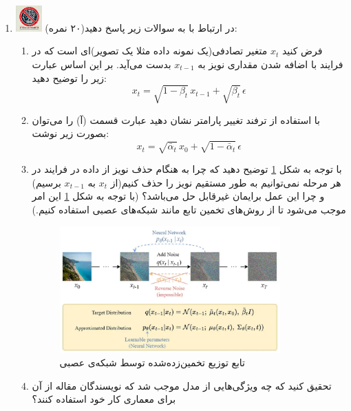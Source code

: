 \documentclass[12pt]{article}
\begin{document}
\begin{enumerate}
    
    \item \includegraphics[width=1cm]{figs/Forbidden_AI.jpg}
    در ارتباط با  به سوالات زیر پاسخ دهید(۲۰ نمره):
    \begin{enumerate}
    \item فرض کنید $x_{t}$ متغیر تصادفی(یک نمونه داده مثلا یک تصویر)‌ای است که در فرایند  با اضافه شدن مقداری نویز به $x_{t-1}$ بدست می‌آید. بر این اساس عبارت زیر را توضیح دهید:
    $$
    x_t = \sqrt{1 - \beta_t} \, x_{t-1} + \sqrt{\beta_t} \, \epsilon
    $$
    \item با استفاده از ترفند تغییر پارامتر نشان دهید عبارت قسمت (آ) را می‌توان بصورت زیر نوشت:\\
    $$
    x_t = \sqrt{\bar{\alpha}_t} \, x_0 + \sqrt{1 - \bar{\alpha}_t} \, \epsilon
    $$
    \item با توجه به شکل \ref{fig:q4}  توضیح دهید که چرا به هنگام حذف نویز از داده در فرایند  در هر مرحله نمی‌توانیم به طور مستقیم نویز را حذف کنیم(از $x_{t}$ به $x_{t-1}$ برسیم) و چرا این عمل برایمان غیرقابل حل می‌باشد؟ (با توجه به شکل \ref{fig:q4} این امر موجب می‌شود تا از روش‌های تخمین تابع مانند شبکه‌های عصبی استفاده کنیم.)
    \begin{figure}[ht]
        \centering
        \includegraphics[width=0.85\textwidth]{figs/Q4.png}
        \caption{تابع توزیع تخمین‌زده‌شده توسط شبکه‌ی عصبی}
        \label{fig:q4}  
    \end{figure}

    \item تحقیق کنید که چه ویژگی‌هایی از مدل  موجب شد که نویسندگان مقاله  از آن برای معماری کار خود استفاده کنند؟
    \end{enumerate}
    

\end{enumerate}
\end{document}
